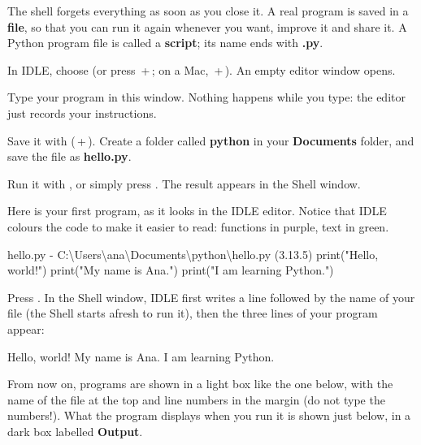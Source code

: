 
The shell forgets everything as soon as you close it. A real program is saved in a \textbf{file},
so that you can run it again whenever you want, improve it and share it. A Python program file is
called a \textbf{script}; its name ends with \textbf{.py}.

\begin{etapes}
\item In IDLE, choose  (or press \,+\,; on a Mac,
  \,+\,). An empty editor window opens.
\item Type your program in this window. Nothing happens while you type: the editor just records your
  instructions.
\item Save it with  (\,+\,). Create a folder called
  \textbf{python} in your \textbf{Documents} folder, and save the file as \textbf{hello.py}.
\item Run it with , or simply press . The result appears in
  the Shell window.
\end{etapes}

Here is your first program, as it looks in the IDLE editor. Notice that IDLE colours the code to
make it easier to read: functions in purple, text in green.

\begin{idleediteur}{hello.py - C:\textbackslash Users\textbackslash ana\textbackslash Documents\textbackslash python\textbackslash hello.py (3.13.5)}
print("Hello, world!")
print("My name is Ana.")
print("I am learning Python.")
\end{idleediteur}

Press . In the Shell window, IDLE first writes a line  followed by the name
of your file (the Shell starts afresh to run it), then the three lines of your program appear:

\rattacher
{}
\begin{sortie}
Hello, world!
My name is Ana.
I am learning Python.
\end{sortie}

\begin{regle}
From now on, programs are shown in a light box like the one below, with the name of the file at the
top and line numbers in the margin (do not type the numbers!). What the program displays when you
run it is shown just below, in a dark box labelled \textbf{Output}.
\end{regle}

